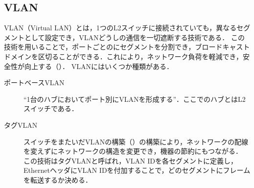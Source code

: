 \subsection{VLAN}
VLAN（Virtual LAN）とは，1つのL2スイッチに接続されていても，異なるセグメントとして設定でき，VLANどうしの通信を一切遮断する技術である．
この技術を用いることで，ポートごとのにセグメントを分割でき，ブロードキャストドメインを区切ることができる．これにより，ネットワーク負荷を軽減でき，安全性が向上する（）．
VLANにはいくつか種類がある．
\begin{description}
    \item[ポートベースVLAN] ``1台のハブにおいてポート別にVLANを形成する''．\cite[p.71]{ネットワーク工学}ここでのハブとはL2スイッチである．
    \item[タグVLAN] スイッチをまたいだVLANの構築（）の構築により，ネットワークの配線を変えずにネットワークの構造を変更でき，機器の節約にもつながる．
        この技術はタグVLANと呼ばれ，VLAN IDを各セグメントに定義し，EthernetヘッダにVLAN IDを付加することで，どのセグメントにフレームを転送するか決める\cite[p.105\ -\ p.106]{マスタリングTCPIP}．
\end{description}
